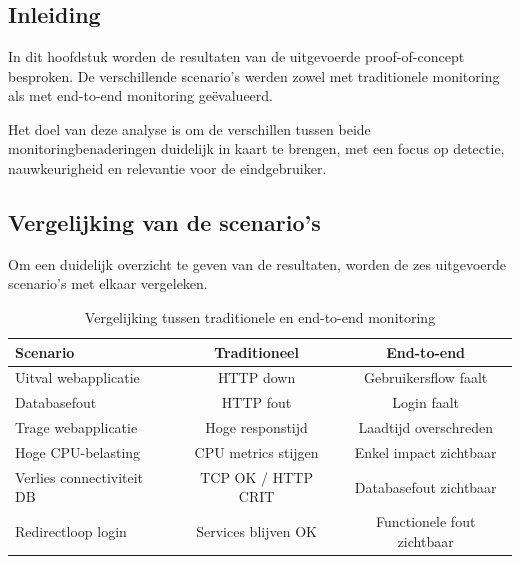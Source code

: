\chapter{}
\label{ch:resultaten}

\section{Inleiding}

In dit hoofdstuk worden de resultaten van de uitgevoerde proof-of-concept besproken. De verschillende scenario’s werden zowel met traditionele monitoring als met end-to-end monitoring geëvalueerd. 

Het doel van deze analyse is om de verschillen tussen beide monitoringbenaderingen duidelijk in kaart te brengen, met een focus op detectie, nauwkeurigheid en relevantie voor de eindgebruiker.

\section{Vergelijking van de scenario’s}

Om een duidelijk overzicht te geven van de resultaten, worden de zes uitgevoerde scenario’s met elkaar vergeleken.

\begin{table}[H]
    \centering
    \begin{tabularx}{\textwidth}{|X|c|c|}
        \hline
        \textbf{Scenario} & \textbf{Traditioneel} & \textbf{End-to-end} \\ \hline
        Uitval webapplicatie & HTTP down & Gebruikersflow faalt \\ \hline
        Databasefout & HTTP fout & Login faalt \\ \hline
        Trage webapplicatie & Hoge responstijd & Laadtijd overschreden \\ \hline
        Hoge CPU-belasting & CPU metrics stijgen & Enkel impact zichtbaar \\ \hline
        Verlies connectiviteit DB & TCP OK / HTTP CRIT & Databasefout zichtbaar \\ \hline
        Redirectloop login & Services blijven OK & Functionele fout zichtbaar \\ \hline
    \end{tabularx}
    \caption{Vergelijking tussen traditionele en end-to-end monitoring}
    \label{tab:vergelijking_monitoring}
\end{table}

